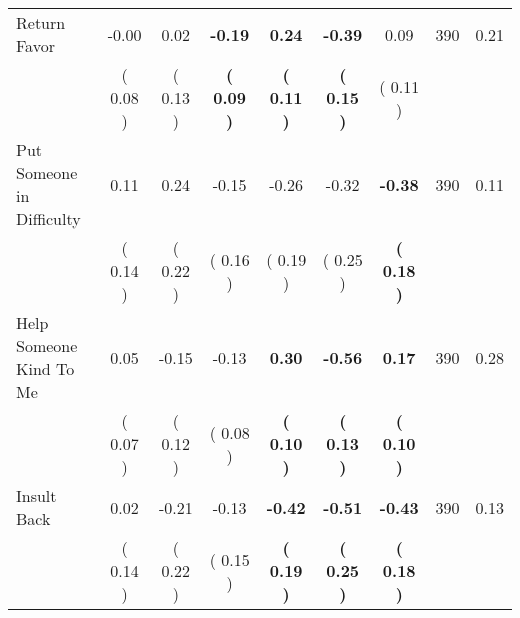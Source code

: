 \begin{tabular}{lcccccccc}
Return Favor &     -0.00 &      0.02 & \textbf{    -0.19} & \textbf{     0.24} & \textbf{    -0.39} &      0.09 & 390 &       0.21 \\ 
 & (     0.08 ) & (     0.13 ) & \textbf{(     0.09 )} & \textbf{(     0.11 )} & \textbf{(     0.15 )} & (     0.11 ) & \\
Put Someone in Difficulty &      0.11 &      0.24 &     -0.15 &     -0.26 &     -0.32 & \textbf{    -0.38} & 390 &       0.11 \\ 
 & (     0.14 ) & (     0.22 ) & (     0.16 ) & (     0.19 ) & (     0.25 ) & \textbf{(     0.18 )} & \\
Help Someone Kind To Me &      0.05 &     -0.15 &     -0.13 & \textbf{     0.30} & \textbf{    -0.56} & \textbf{     0.17} & 390 &       0.28 \\ 
 & (     0.07 ) & (     0.12 ) & (     0.08 ) & \textbf{(     0.10 )} & \textbf{(     0.13 )} & \textbf{(     0.10 )} & \\
Insult Back &      0.02 &     -0.21 &     -0.13 & \textbf{    -0.42} & \textbf{    -0.51} & \textbf{    -0.43} & 390 &       0.13 \\ 
 & (     0.14 ) & (     0.22 ) & (     0.15 ) & \textbf{(     0.19 )} & \textbf{(     0.25 )} & \textbf{(     0.18 )} & \\
\bottomrule
\end{tabular}
